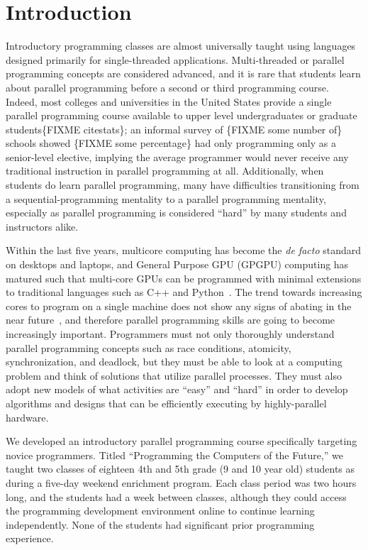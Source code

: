 \documentclass{sig-alternate}
\newcommand{\FIXME}[1]{{\color{red}\{FIXME #1\}}}
\begin{document}
\section{Introduction}
Introductory programming classes are almost universally taught 
using languages designed primarily for single-threaded applications.  Multi-threaded or
parallel programming concepts are considered advanced, and it is rare that students learn about
parallel programming before a second or third programming course.  Indeed, most colleges and
universities in the United States provide a single parallel programming course available 
to upper level undergraduates or graduate students\FIXME{citestats}; an informal survey
of \FIXME{some number of} schools showed \FIXME{some percentage} had only programming only 
as a senior-level elective, implying the
average programmer would never receive any traditional instruction in parallel programming at all.
Additionally, when students do learn parallel programming, many have difficulties transitioning
from a sequential-programming mentality to a parallel programming mentality, especially as parallel
programming is considered ``hard'' by many students and instructors 
alike.~\cite{parallelExpectations}

Within the last five years, multicore computing has become the \emph{de facto} standard on
desktops and laptops, and General Purpose GPU (GPGPU) computing has matured such that multi-core 
GPUs can be programmed with minimal extensions to traditional languages such as C++ and 
Python~\cite{gpgpuLanguages}.  The trend towards increasing cores to program on a
single machine does not show any signs of abating in the near future~\cite{multicoreTrends}, and
therefore parallel programming skills are going to become increasingly important.  Programmers
must not only thoroughly understand parallel programming concepts such as race conditions,
atomicity, synchronization, and deadlock, but they must be able to look at a computing problem
and think of solutions that utilize parallel processes.
They must also adopt new models of what activities are ``easy'' and ``hard''
in order to develop algorithms and designs that can be efficiently executing by highly-parallel hardware.

We developed an introductory parallel programming course specifically targeting novice programmers.  
Titled ``Programming the Computers of the Future,'' we taught two classes of eighteen 4th and 5th grade 
(9 and 10 year old) students as during a five-day weekend enrichment program.
Each class period was two hours long, and the students had a week between classes, although they
could access the programming development environment online to continue learning independently.
None of the students had significant prior programming experience.
\end{document}
